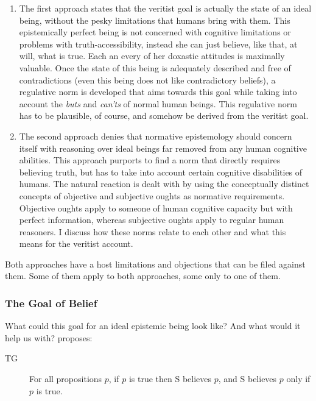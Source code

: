 \documentclass[12pt,numbers=noenddot]{scrartcl}
\begin{document}
\begin{enumerate}
\item The first approach states that the veritist goal is actually the state of an ideal being, without the pesky limitations that humans bring with them. This epistemically perfect being is not concerned with cognitive limitations or problems with truth-accessibility, instead she can just believe, like that, at will, what is true. Each an every of her doxastic attitudes is maximally valuable. Once the state of this being is adequately described and free of contradictions (even this being does not like contradictory beliefs), a regulative norm is developed that aims towards this goal while taking into account the \emph{buts} and \emph{can'ts} of normal human beings. This regulative norm has to be plausible, of course, and somehow be derived from the veritist goal.

\item The second approach denies that normative epistemology should concern itself with reasoning over ideal beings far removed from any human cognitive abilities. This approach purports to find a norm that directly requires believing truth, but has to take into account certain cognitive disabilities of humans. The natural reaction is dealt with by using the conceptually distinct concepts of objective and subjective oughts as normative requirements. Objective oughts apply to someone of human cognitive capacity but with perfect information, whereas subjective oughts apply to regular human reasoners. I discuss how these norms relate to each other and what this means for the veritist account.
\end{enumerate}
Both approaches have a host limitations and objections that can be filed against them. Some of them apply to both approaches, some only to one of them.

\subsubsection{The Goal of Belief}\label{sec:goalofbelief}

What could this goal for an ideal epistemic being look like? And what would it help us with? \textcite[157]{David2001-DAVTAT-7} proposes:

\begin{description}
    \item[TG] For all propositions $p$, if $p$ is true then S believes $p$, and S believes $p$ only if $p$ is true.
\end{description}
\end{document}
